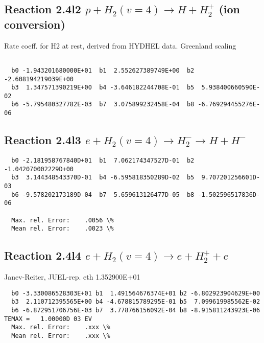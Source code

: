 \documentclass[12pt,dvipdfmx]{article}
\begin{document}
\subsection{
Reaction 2.4l2
$ p + H_2(v=4) \rightarrow H + H_2^+$ (ion conversion)
}
Rate coeff. for H2 at rest, derived from HYDHEL data. Greenland scaling


\begin{small}\begin{verbatim}

  b0 -1.943201680000E+01  b1  2.552627389749E+00  b2 -2.608194219039E+00
  b3  1.347571390219E+00  b4 -3.646182244708E-01  b5  5.938400660590E-02
  b6 -5.795480327782E-03  b7  3.075899232458E-04  b8 -6.769294455276E-06

\end{verbatim}\end{small}

\newpage

\subsection{
Reaction 2.4l3
 $ e + H_2(v=4) \rightarrow H_2^- \rightarrow H + H^-$
}


\begin{small}\begin{verbatim}
  b0 -2.181958767840D+01  b1  7.062174347527D-01  b2 -1.042070002229D+00
  b3  3.144348543370D-01  b4 -6.595818350289D-02  b5  9.707201256601D-03
  b6 -9.578202173189D-04  b7  5.659613126477D-05  b8 -1.502596517836D-06

  Max. rel. Error:    .0056 \%
  Mean rel. Error:    .0023 \%

\end{verbatim}\end{small}

\subsection{
Reaction 2.4l4
 $ e + H_2(v=4) \rightarrow e + H_2^+  + e$
}
Janev-Reiter, JUEL-rep. eth 1.352900E+01

\begin{small}\begin{verbatim}
  b0 -3.330086528303E+01 b1  1.491564676374E+01 b2 -6.802923904629E+00
  b3  2.110712395565E+00 b4 -4.678815789295E-01 b5  7.099619985562E-02
  b6 -6.872951706756E-03 b7  3.778766156092E-04 b8 -8.915811243923E-06
TEMAX =   1.00000D 03 EV
  Max. rel. Error:    .xxx \%
  Mean rel. Error:    .xxx \%
\end{verbatim}\end{small}
\end{document}
